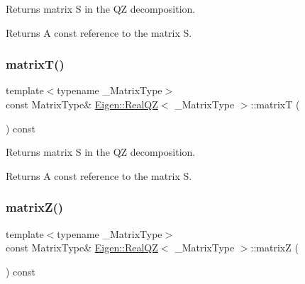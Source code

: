 Returns matrix S in the QZ decomposition. 

\begin{DoxyReturn}{Returns}
A const reference to the matrix S. 
\end{DoxyReturn}
\mbox{\label{class_eigen_1_1_real_q_z_a8dc963d8ea2a17df9d8d718e9e34d06f}} 
\subsubsection{\texorpdfstring{matrixT()}{matrixT()}}
{\footnotesize\ttfamily template$<$typename \+\_\+\+Matrix\+Type$>$ \\
const Matrix\+Type\& \mbox{\hyperlink{class_eigen_1_1_real_q_z}{Eigen\+::\+Real\+QZ}}$<$ \+\_\+\+Matrix\+Type $>$\+::matrixT (\begin{DoxyParamCaption}{ }\end{DoxyParamCaption}) const\hspace{0.3cm}{\ttfamily [inline]}}



Returns matrix S in the QZ decomposition. 

\begin{DoxyReturn}{Returns}
A const reference to the matrix S. 
\end{DoxyReturn}
\mbox{\label{class_eigen_1_1_real_q_z_a19a116383f11423179b4d8f316da6f67}} 
\subsubsection{\texorpdfstring{matrixZ()}{matrixZ()}}
{\footnotesize\ttfamily template$<$typename \+\_\+\+Matrix\+Type$>$ \\
const Matrix\+Type\& \mbox{\hyperlink{class_eigen_1_1_real_q_z}{Eigen\+::\+Real\+QZ}}$<$ \+\_\+\+Matrix\+Type $>$\+::matrixZ (\begin{DoxyParamCaption}{ }\end{DoxyParamCaption}) const\hspace{0.3cm}{\ttfamily [inline]}}



